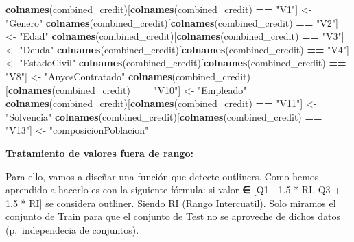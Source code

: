 \documentclass[
]{article}
\newenvironment{Shaded}{\begin{snugshade}}{\end{snugshade}}
\newcommand{\FunctionTok}[1]{\textcolor[rgb]{0.13,0.29,0.53}{\textbf{#1}}}
\newcommand{\NormalTok}[1]{#1}
\newcommand{\OtherTok}[1]{\textcolor[rgb]{0.56,0.35,0.01}{#1}}
\newcommand{\SpecialCharTok}[1]{\textcolor[rgb]{0.81,0.36,0.00}{\textbf{#1}}}
\newcommand{\StringTok}[1]{\textcolor[rgb]{0.31,0.60,0.02}{#1}}
\begin{document}
\begin{Shaded}
\begin{Highlighting}[]
\FunctionTok{colnames}\NormalTok{(combined\_credit)[}\FunctionTok{colnames}\NormalTok{(combined\_credit) }\SpecialCharTok{==} \StringTok{"V1"}\NormalTok{] }\OtherTok{\textless{}{-}} \StringTok{"Genero"}
\FunctionTok{colnames}\NormalTok{(combined\_credit)[}\FunctionTok{colnames}\NormalTok{(combined\_credit) }\SpecialCharTok{==} \StringTok{"V2"}\NormalTok{] }\OtherTok{\textless{}{-}} \StringTok{"Edad"}
\FunctionTok{colnames}\NormalTok{(combined\_credit)[}\FunctionTok{colnames}\NormalTok{(combined\_credit) }\SpecialCharTok{==} \StringTok{"V3"}\NormalTok{] }\OtherTok{\textless{}{-}} \StringTok{"Deuda"}
\FunctionTok{colnames}\NormalTok{(combined\_credit)[}\FunctionTok{colnames}\NormalTok{(combined\_credit) }\SpecialCharTok{==} \StringTok{"V4"}\NormalTok{] }\OtherTok{\textless{}{-}} \StringTok{"EstadoCivil"}
\FunctionTok{colnames}\NormalTok{(combined\_credit)[}\FunctionTok{colnames}\NormalTok{(combined\_credit) }\SpecialCharTok{==} \StringTok{"V8"}\NormalTok{] }\OtherTok{\textless{}{-}} \StringTok{"AnyosContratado"}
\FunctionTok{colnames}\NormalTok{(combined\_credit)[}\FunctionTok{colnames}\NormalTok{(combined\_credit) }\SpecialCharTok{==} \StringTok{"V10"}\NormalTok{] }\OtherTok{\textless{}{-}} \StringTok{"Empleado"}
\FunctionTok{colnames}\NormalTok{(combined\_credit)[}\FunctionTok{colnames}\NormalTok{(combined\_credit) }\SpecialCharTok{==} \StringTok{"V11"}\NormalTok{] }\OtherTok{\textless{}{-}} \StringTok{"Solvencia"}
\FunctionTok{colnames}\NormalTok{(combined\_credit)[}\FunctionTok{colnames}\NormalTok{(combined\_credit) }\SpecialCharTok{==} \StringTok{"V13"}\NormalTok{] }\OtherTok{\textless{}{-}} \StringTok{"composicionPoblacion"}
\end{Highlighting}
\end{Shaded}

\ul{\textbf{Tratamiento de valores fuera de rango:}}

Para ello, vamos a diseñar una función que detecte outliners. Como hemos
aprendido a hacerlo es con la siguiente fórmula: si valor \textbf{∈}
{[}Q1 - 1.5 * RI, Q3 + 1.5 * RI{]} se considera outliner. Siendo RI
(Rango Intercuatil). Solo miramos el conjunto de Train para que el
conjunto de Test no se aproveche de dichos datos (p.~independecia de
conjuntos).
\end{document}
